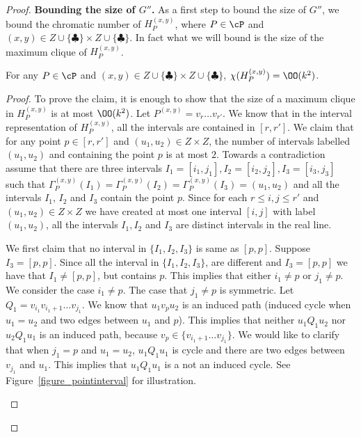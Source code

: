 \begin{proof}
\medskip
\noindent 
{\bf Bounding the size of $G''$.} As a first step to bound the size of $G''$, we bound the chromatic number of $H_P^{(x,y)}$, where $P\in \cP$ and 
$(x,y)\in Z\cup \{\clubsuit\} \times Z \cup \{\clubsuit\}$. In fact what we will bound is the size of the maximum clique of $H_P^{(x,y)}$. 
\begin{claim}
\label{claim:CPpw}
For any $P\in \cP$ and $(x,y)\in Z\cup \{\clubsuit\} \times Z \cup \{\clubsuit\}$, $\chi(H_P^{(x,y)})=\OO(k^2)$. 
\end{claim}
\begin{proof}
To prove the claim, it is enough to show that the size of a maximum clique in $H_P^{(x,y)}$ is at most $\OO(k^2)$. 
Let $P^{(x,y)}= v_r\ldots v_{r'}$. We know that in the interval representation of $H_P^{(x,y)}$,  
all the intervals are contained in $[r,r']$. We claim that for any point $p\in [r,r']$ and $(u_1,u_2)\in Z \times Z$,  
the number of intervals labelled $(u_1,u_2)$ and containing the point $p$ is at most $2$. Towards a contradiction assume that there are 
three intervals $I_1=[i_1,j_1],I_2=[i_2,j_2],I_3=[i_3,j_3]$ such that $\Gamma_P^{(x,y)}(I_1)=\Gamma_P^{(x,y)}(I_2)=\Gamma_P^{(x,y)}(I_3)=(u_1,u_2)$ and all the 
intervals $I_1$, $I_2$ and $I_3$ contain the point $p$. Since for each $r\leq i,j\leq r'$ and $(u_1,u_2)\in Z\times Z$ 
we have created at most one interval $[i,j]$ with label $(u_1,u_2)$, all the intervals $I_1,I_2$ and $I_3$ are distinct intervals in the real line. 

We first claim that no interval in $\{I_1,I_2,I_3\}$ is same as $[p,p]$. Suppose $I_3=[p,p]$. 
Since all the interval in $\{I_1,I_2,I_3\}$, are different and $I_3=[p,p]$ we have that 
$I_1\neq [p,p]$, but contains $p$. This implies that either $i_1\neq p$ or $j_1\neq p$. We consider 
the case $i_1\neq p$. The case that $j_1\neq p$  is symmetric. 
Let $Q_1=v_{i_1}v_{i_1+1}\ldots v_{j_1}$. 
We know that $u_1v_pu_2$ is an induced 
path (induced cycle when $u_1=u_2$ and two edges between $u_1$ and $p$). This 
implies that neither $u_1Q_1u_2$ nor $u_2Q_1u_1$ is an induced path, 
because $v_p\in \{v_{i_1+1}\ldots v_{j_1}\}$. We would like to clarify that  
when ${j_1}=p$ and $u_1=u_2$, $u_1Q_1u_1$ is cycle 
and there are two edges between $v_{j_1}$ and $u_1$. 
This implies that $u_1Q_1u_1$ is a not an induced cycle.
 See Figure~\ref{figure_pointinterval} for illustration.  



\begin{figure}
\begin{subfigure}[b]{0.5\textwidth}
        \centering


\end{subfigure}
\end{figure}
\end{proof}
\end{proof}
